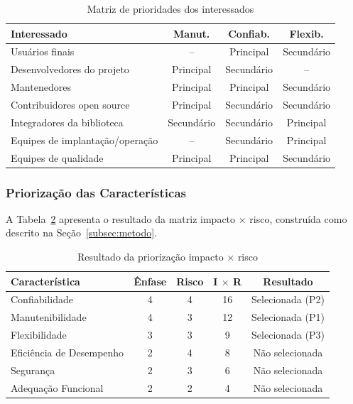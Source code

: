\documentclass[12pt]{article}
\begin{document}
\begin{table}[!ht]
\centering
\caption{Matriz de prioridades dos interessados}
\label{tab:interessados}
\vspace{4pt}
\small
\begin{tabular}{lccc}
\toprule
\textbf{Interessado} & \textbf{Manut.} & \textbf{Confiab.} & \textbf{Flexib.} \\
\midrule
Usuários finais                 & --        & Principal  & Secundário \\
Desenvolvedores do projeto      & Principal & Secundário & --         \\
Mantenedores                    & Principal & Principal  & Secundário \\
Contribuidores open source      & Principal & Secundário & Secundário \\
Integradores da biblioteca      & Secundário & Secundário & Principal \\
Equipes de implantação/operação & --        & Secundário & Principal  \\
Equipes de qualidade            & Principal & Principal  & Secundário \\
\bottomrule
\end{tabular}
\end{table}

\subsubsection{Priorização das Características}
\label{subsec:priorizacao}

A Tabela~\ref{tab:priorizacao} apresenta o resultado da matriz impacto $\times$ risco, construída como descrito na Seção~\ref{subsec:metodo}.

\begin{table}[!ht]
\centering
\caption{Resultado da priorização impacto $\times$ risco}
\label{tab:priorizacao}
\vspace{4pt}
\small
\begin{tabular}{lcccc}
\toprule
\textbf{Característica} & \textbf{Ênfase} & \textbf{Risco} & \textbf{I $\times$ R} & \textbf{Resultado} \\
\midrule
Confiabilidade   & 4 & 4 & 16 & Selecionada (P2) \\
Manutenibilidade & 4 & 3 & 12 & Selecionada (P1) \\
Flexibilidade    & 3 & 3 & 9  & Selecionada (P3) \\
\midrule
Eficiência de Desempenho & 2 & 4 & 8 & Não selecionada \\
Segurança        & 2 & 3 & 6  & Não selecionada \\
Adequação Funcional & 2 & 2 & 4 & Não selecionada \\
\bottomrule
\end{tabular}
\end{table}
\end{document}
